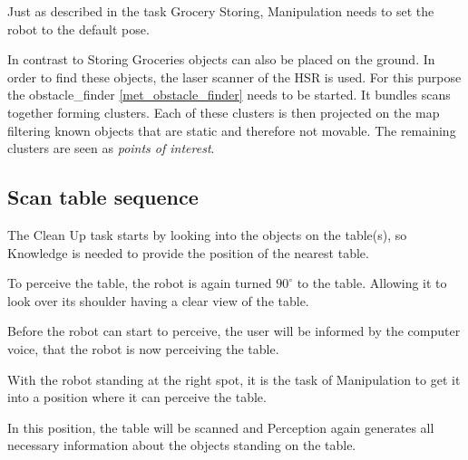 \documentclass[main.tex]{subfiles}
\begin{document}
	\begin{manipulation}
	Just as described in the task Grocery Storing, Manipulation needs to set the robot to the default pose.
	\end{manipulation}

	\begin{navigation}
		In contrast to Storing Groceries objects can also be placed on the ground. In order to find these objects, the laser scanner of the HSR is used. For this purpose the obstacle\_finder \ref{met_obstacle_finder} needs to be started. It bundles scans together forming clusters. Each of these clusters is then projected on the map filtering known objects that are static and therefore not movable. The remaining clusters are seen as \textit{points of interest}. 
	\end{navigation}

	\subsection{Scan table sequence}
	
	\begin{knowledge}
	The Clean Up task starts by looking into the objects on the table(s), so Knowledge is needed to provide the position of the nearest table.
	\end{knowledge}
	
	\begin{navigation}
	To perceive the table, the robot is again turned $90^\circ$ to the table. Allowing it to look over its shoulder having a clear view of the table.
	\end{navigation}
	
	\begin{nlp}
	Before the robot can start to perceive, the user will be informed by the computer voice, that the robot is now perceiving the table.
	\end{nlp}
	
	\begin{manipulation}
	With the robot standing at the right spot, it is the task of Manipulation to get it into a position where it can perceive the table.
   \end{manipulation} 
	
	\begin{perception}
	In this position, the table will be scanned and Perception again generates all necessary information about the objects standing on the table.
	\end{perception}
	
\end{document}
